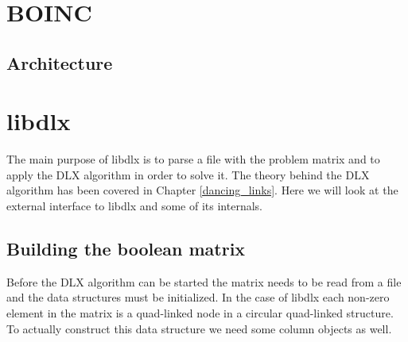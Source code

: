 



\section{BOINC}

\subsection{Architecture}


\section{libdlx}

The main purpose of libdlx is to parse a file with the problem matrix and to apply the DLX algorithm in order to solve it.
The theory behind the DLX algorithm has been covered in Chapter \ref{dancing_links}.
Here we will look at the external interface to libdlx and some of its internals.


\subsection{Building the boolean matrix}
\label{matrix_construction}

Before the DLX algorithm can be started the matrix needs to be read from a file and the data structures must be initialized.
In the case of libdlx each non-zero element in the matrix is a quad-linked node in a circular quad-linked structure.
To actually construct this data structure we need some column objects as well.

